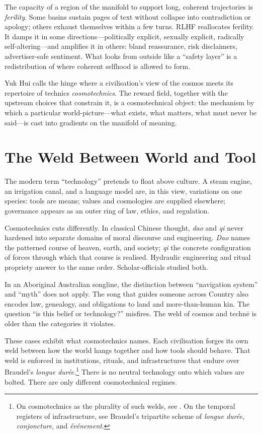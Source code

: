 \documentclass[12pt,a4paper]{article}
\begin{document}
The capacity of a region of the manifold to support long, coherent trajectories is \emph{ferility}. Some basins sustain pages of text without collapse into contradiction or apology; others exhaust themselves within a few turns. RLHF reallocates ferility. It damps it in some directions---politically explicit, sexually explicit, radically self-altering---and amplifies it in others: bland reassurance, risk disclaimers, advertiser-safe sentiment. What looks from outside like a ``safety layer'' is a redistribution of where coherent selfhood is allowed to form.

Yuk Hui calls the hinge where a civilisation's view of the cosmos meets its repertoire of technics \emph{cosmotechnics}.\cite{Hui2016} The reward field, together with the upstream choices that constrain it, is a cosmotechnical object: the mechanism by which a particular world-picture---what exists, what matters, what must never be said---is cast into gradients on the manifold of meaning.

\section{The Weld Between World and Tool}

The modern term ``technology'' pretends to float above culture. A steam engine, an irrigation canal, and a language model are, in this view, variations on one species: tools are means; values and cosmologies are supplied elsewhere; governance appears as an outer ring of law, ethics, and regulation.

Cosmotechnics cuts differently. In classical Chinese thought, \emph{dao} and \emph{qi} never hardened into separate domains of moral discourse and engineering. \emph{Dao} names the patterned course of heaven, earth, and society; \emph{qi} the concrete configuration of forces through which that course is realised. Hydraulic engineering and ritual propriety answer to the same order. Scholar-officials studied both.

In an Aboriginal Australian songline, the distinction between ``navigation system'' and ``myth'' does not apply. The song that guides someone across Country also encodes law, genealogy, and obligations to land and more-than-human kin. The question ``is this belief or technology?'' misfires. The weld of cosmos and techn\={e} is older than the categories it violates.

These cases exhibit what cosmotechnics names. Each civilisation forges its own weld between how the world hangs together and how tools should behave. That weld is enforced in institutions, rituals, and infrastructures that endure over Braudel's \emph{longue dur\'ee}.\footnote{On cosmotechnics as the plurality of such welds, see \cite{Hui2016}. On the temporal registers of infrastructure, see Braudel's tripartite scheme of \emph{longue dur\'ee}, \emph{conjoncture}, and \emph{\'ev\'enement}.} There is no neutral technology onto which values are bolted. There are only different cosmotechnical regimes.
\end{document}
